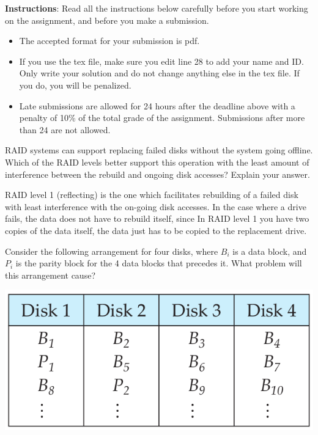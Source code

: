 \documentclass[a4 paper]{article}
\begin{document}
\textbf{Instructions}: Read all the instructions below carefully before you start working on the assignment, and before you make a submission.
\begin{itemize}
    \item The accepted format for your submission is pdf. 
    \item If you use the tex file, make sure you edit line 28 to add your name and ID. Only write your solution and do not change anything else in the tex file. If you do, you will be penalized.
    \item Late submissions are allowed for 24 hours after the deadline above with a penalty of 10\% of the total grade of the assignment. Submissions after more than 24 are not allowed.
\end{itemize}

RAID systems can support replacing failed disks without the system going offline. Which of the RAID levels better support this operation with the least amount of interference between the rebuild and ongoing disk accesses? Explain your answer.

RAID level 1 (reflecting) is the one which facilitates rebuilding of a failed disk with least interference with the on-going disk accesses. 
In the case where a drive fails, the data does not have to rebuild itself, since In RAID level 1 you have two copies of the data itself,
the data just has to be copied to the replacement drive.

Consider the following arrangement for four disks, where $B_{i}$ is a data block, and $P_{i}$ is the parity block for the 4 data blocks that precedes it. What problem will this arrangement cause?

{\centering \includegraphics[width=\textwidth/2]{figure1.png}}
\end{document}
